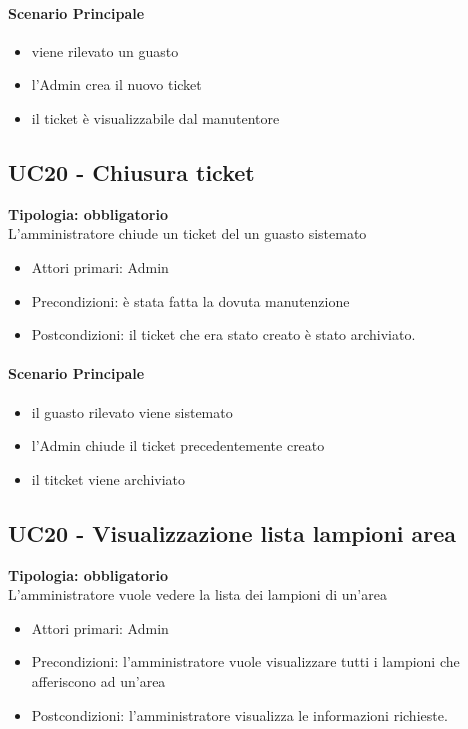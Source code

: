 \documentclass[12pt]{article}
\begin{document}
\paragraph{Scenario Principale}
\begin{itemize}
	\item viene rilevato un guasto
	\item l'Admin crea il nuovo ticket
	\item il ticket è visualizzabile dal manutentore
\end{itemize}


\subsection{UC20 - Chiusura ticket}
\textbf{Tipologia: obbligatorio}\\
L'amministratore chiude un ticket del un guasto sistemato
\begin{itemize}
	\item Attori primari: Admin
	\item Precondizioni: è stata fatta la dovuta manutenzione
	\item Postcondizioni: il ticket che era stato creato è stato archiviato. 
\end{itemize}
\paragraph{Scenario Principale}
\begin{itemize}
	\item il guasto rilevato viene sistemato
	\item l'Admin chiude il ticket precedentemente creato
	\item il titcket viene archiviato
\end{itemize}

\subsection{UC20 - Visualizzazione lista lampioni area}
\textbf{Tipologia: obbligatorio}\\
L'amministratore vuole vedere la lista dei lampioni di un'area
\begin{itemize}
	\item Attori primari: Admin
	\item Precondizioni: l'amministratore vuole visualizzare tutti i lampioni che afferiscono ad un'area
	\item Postcondizioni: l'amministratore visualizza le informazioni richieste. 
\end{itemize}
\end{document}
